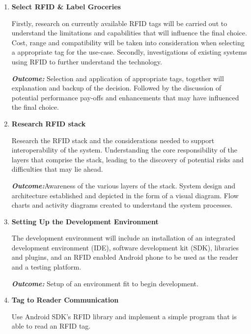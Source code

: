 \documentclass[a4paper, 11pt]{article}
\begin{document}
\begin{enumerate}
    \item \textbf{Select RFID \& Label Groceries}
   	\begin{flushleft}Firstly, research on currently available RFID tags will be carried out to understand the limitations and capabilities that will influence the final choice. Cost, range and compatibility will be taken into consideration when selecting a appropriate tag for the use-case. Secondly, investigations of existing systems using RFID to further understand the technology. 
	
	\emph{\textbf{Outcome:}} Selection and application of appropriate tags, together will explanation and backup of the decision. Followed by the discussion of potential performance pay-offs and enhancements that may have influenced the final choice.
	  	\end{flushleft}
	  \vspace{\baselineskip}

   \item \textbf{Research RFID stack}
   	\begin{flushleft}Research the RFID stack and the considerations needed to support interoperability of the system. Understanding the core responsibility of the layers that comprise the stack, leading to the discovery of potential risks and difficulties that may lie ahead.
	
	\emph{\textbf{Outcome:}}Awareness of the various layers of the stack. System design and architecture established and depicted in the form of a visual diagram. Flow charts and activity diagrams created to understand the system processes. 
	\end{flushleft}
	  \vspace{\baselineskip}
   \item \textbf{Setting Up the Development Environment}
   	\begin{flushleft}The development environment will include an installation of an integrated development environment (IDE), software development kit (SDK), libraries and plugins, and an RFID enabled Android phone to be used as the reader and a testing platform. 
			
		\emph{\textbf{Outcome:}}  Setup of an environment fit to begin development.
		\end{flushleft}
	  \vspace{\baselineskip}
	   \item \textbf{Tag to Reader Communication}
   	\begin{flushleft}Use Android SDK's RFID library and implement a simple program that is able to read an RFID tag.
		

\end{flushleft}
\end{enumerate}
\end{document}
